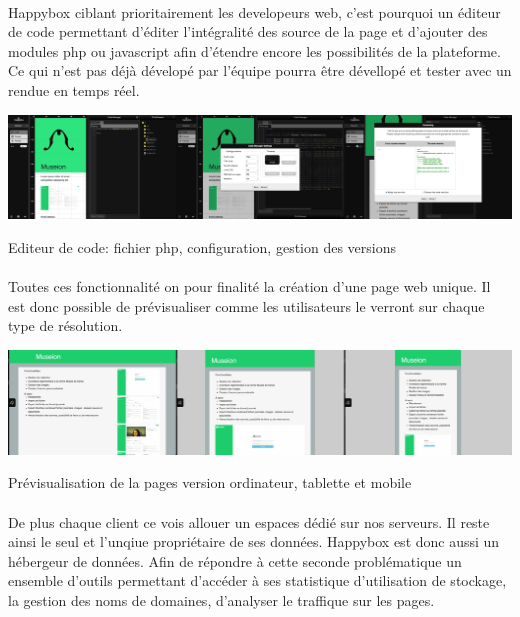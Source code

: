 \documentclass[11pt, a4paper ]{article}
\begin{document}
\paragraph{} %
Happybox ciblant prioritairement les developeurs web, c'est pourquoi un éditeur de code permettant d'éditer l'intégralité des source de la page et d'ajouter des modules php ou javascript afin d'étendre encore les possibilités de la plateforme. Ce qui n'est pas déjà dévelopé par l'équipe pourra être dévellopé et tester avec un rendue en temps réel.
\begin{center}
	\includegraphics[width=\textwidth]{images/HBscreen/codeManager.png}
	\caption{Editeur de code: fichier php, configuration, gestion des versions}
\end{center}

\paragraph{}

Toutes ces fonctionnalité on pour finalité la création d'une page web unique. Il est donc possible de prévisualiser comme les utilisateurs le verront sur chaque type de résolution.
\begin{center}
	\includegraphics[width=\textwidth]{images/HBscreen/preview.png}
	\caption{Prévisualisation de la pages version ordinateur, tablette et mobile}
\end{center}

\paragraph{}
De plus chaque client ce vois allouer un espaces dédié sur nos serveurs. Il reste ainsi le seul et l'unqiue propriétaire de ses données. Happybox est donc aussi un hébergeur de données. Afin de répondre à cette seconde problématique un ensemble d'outils permettant d'accéder à ses statistique d'utilisation de stockage, la gestion des noms de domaines, d'analyser le traffique sur les pages.
\end{document}
